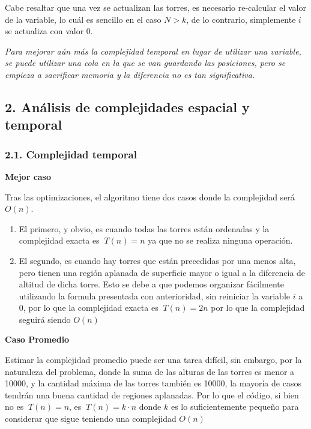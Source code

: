 \documentclass[
]{article}
\providecommand{\tightlist}{%
  \setlength{\itemsep}{0pt}\setlength{\parskip}{0pt}}
\begin{document}
Cabe resaltar que una vez se actualizan las torres, es necesario
re-calcular el valor de la variable, lo cuál es sencillo en el caso
\(N > k\), de lo contrario, simplemente \(i\) se actualiza con valor 0.

\emph{Para mejorar aún más la complejidad temporal en lugar de utilizar
una variable, se puede utilizar una cola en la que se van guardando las
posiciones, pero se empieza a sacrificar memoria y la diferencia no es
tan significativa.}

\hypertarget{anuxe1lisis-de-complejidades-espacial-y-temporal}{%
\subsection{2. Análisis de complejidades espacial y
temporal}\label{anuxe1lisis-de-complejidades-espacial-y-temporal}}

\hypertarget{complejidad-temporal}{%
\subsubsection{2.1. Complejidad temporal}\label{complejidad-temporal}}

\textbf{Mejor caso}

Tras las optimizaciones, el algoritmo tiene dos casos donde la
complejidad será \(O(n)\).

\begin{enumerate}
\def\labelenumi{\arabic{enumi}.}
\tightlist
\item
  El primero, y obvio, es cuando todas las torres están ordenadas y la
  complejidad exacta es \(\ T(n) = n\) ya que no se realiza ninguna
  operación.
\item
  El segundo, es cuando hay torres que están precedidas por una menos
  alta, pero tienen una región aplanada de superficie mayor o igual a la
  diferencia de altitud de dicha torre. Esto se debe a que podemos
  organizar fácilmente utilizando la formula presentada con
  anterioridad, sin reiniciar la variable \(i\) a \(0\), por lo que la
  complejidad exacta es \(\ T(n) = 2n\) por lo que la complejidad
  seguirá siendo \(O(n)\)
\end{enumerate}

\textbf{Caso Promedio}

Estimar la complejidad promedio puede ser una tarea difícil, sin
embargo, por la naturaleza del problema, donde la suma de las alturas de
las torres es menor a 10000, y la cantidad máxima de las torres también
es 10000, la mayoría de casos tendrán una buena cantidad de regiones
aplanadas. Por lo que el código, si bien no es \(\ T(n) = n\), es
\(\ T(n) = k\cdot n\) donde \(k\) es lo suficientemente pequeño para
considerar que sigue teniendo una complejidad \(O(n)\)
\end{document}
